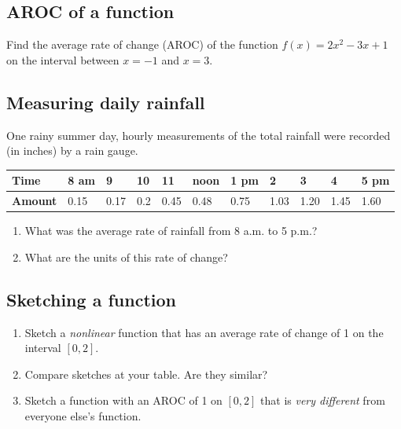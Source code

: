 \documentclass[
]{book}
\providecommand{\tightlist}{%
  \setlength{\itemsep}{0pt}\setlength{\parskip}{0pt}}
\begin{document}
\hypertarget{aroc-of-a-function}{%
\subsection{AROC of a function}\label{aroc-of-a-function}}

Find the average rate of change (AROC) of the function \(f(x) = 2x^2 -3x + 1\) on the interval between \(x=-1\) and \(x=3\).

\hypertarget{measuring-daily-rainfall}{%
\subsection{Measuring daily rainfall}\label{measuring-daily-rainfall}}

One rainy summer day, hourly measurements of the total rainfall were recorded (in inches) by a rain gauge.

\begin{longtable}[]{@{}lllllllllll@{}}
\toprule
\textbf{Time} & 8 am & 9 & 10 & 11 & noon & 1 pm & 2 & 3 & 4 & 5 pm\tabularnewline
\midrule
\endhead
\textbf{Amount} & 0.15 & 0.17 & 0.2 & 0.45 & 0.48 & 0.75 & 1.03 & 1.20 & 1.45 & 1.60\tabularnewline
\bottomrule
\end{longtable}

\begin{enumerate}
\def\labelenumi{\arabic{enumi}.}
\tightlist
\item
  What was the average rate of rainfall from 8 a.m. to 5 p.m.?
\item
  What are the units of this rate of change?
\end{enumerate}

\hypertarget{sketching-a-function}{%
\subsection{Sketching a function}\label{sketching-a-function}}

\begin{enumerate}
\def\labelenumi{\arabic{enumi}.}
\tightlist
\item
  Sketch a \emph{nonlinear} function that has an average rate of change of 1 on the interval \([0,2]\).
\item
  Compare sketches at your table. Are they similar?
\item
  Sketch a function with an AROC of 1 on \([0,2]\) that is \emph{very different} from everyone else's function.
\end{enumerate}
\end{document}
